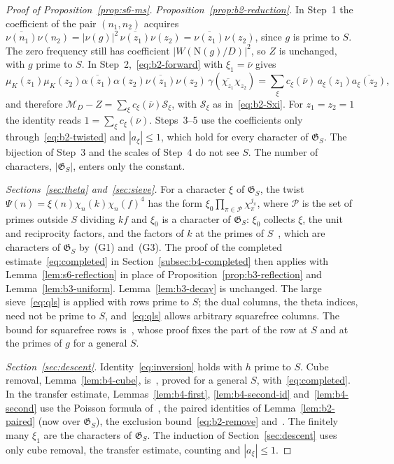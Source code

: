 \documentclass[11pt]{article}
\numberwithin{equation}{section}
\newcommand{\N}{\mathrm N}
\newcommand{\muk}{\mu_K}
\begin{document}
\begin{proof}[Proof of Proposition~\ref{prop:s6-ms}]
\emph{Proposition~\ref{prop:b2-reduction}.} In Step~1 the coefficient of the pair $(n_1,n_2)$ acquires
$\overline{\nu(n_1)}\nu(n_2)=|\nu(g)|^2\,\overline{\nu(z_1)}\nu(z_2)=\overline{\nu(z_1)}\nu(z_2)$, since $g$ is
prime to $S$. The zero frequency still has coefficient $|W(\N(g)/D)|^2$, so $Z$ is unchanged, with $g$ prime
to $S$. In Step~2,~\eqref{eq:b2-forward} with $\xi_1=\overline\nu$ gives
\begin{equation}\label{eq:d195}
 \muk(z_1)\muk(z_2)\overline{\alpha(z_1)}\alpha(z_2)\overline{\nu(z_1)}\nu(z_2)\,
 \gamma(\overline{\chi_{z_1}}\chi_{z_2})=\sum_\xi c_\xi(\overline\nu)\,a_\xi(z_1)\overline{a_\xi(z_2)},
\end{equation}
and therefore $\mathcal M_D-Z=\sum_\xi c_\xi(\overline\nu)\mathcal S_\xi$, with $\mathcal S_\xi$
as in~\eqref{eq:b2-Sxi}. For $z_1=z_2=1$ the identity reads $1=\sum_\xi c_\xi(\overline\nu)$. Steps~3--5 use
the coefficients only through~\eqref{eq:b2-twisted} and $|a_\xi|\le1$, which hold for every character of
$\mathfrak G_S$. The bijection of Step~3 and the scales of Step~4 do not see $S$. The number of characters,
$|\mathfrak G_S|$, enters only the constant.

\emph{Sections~\ref{sec:theta} and~\ref{sec:sieve}.} For a character $\xi$ of $\mathfrak G_S$, the twist
$\Psi(n)=\xi(n)\chi_n(k)\chi_n(f)^4$ has the form $\xi_0\prod_{\pi\in\mathcal P}\chi_\pi^{j_\pi}$, where
$\mathcal P$ is the set of primes outside $S$ dividing $kf$ and $\xi_0$ is a character of $\mathfrak G_S$:
$\xi_0$ collects $\xi$, the unit and reciprocity factors, and the factors of $k$ at the primes of
$S$~\cite[(6.17)]{OAI1112}, which are characters of $\mathfrak G_S$ by~(G1) and~(G3). The proof of the completed
estimate~\eqref{eq:completed} in Section~\ref{subsec:b4-completed} then applies with
Lemma~\ref{lem:s6-reflection} in place of Proposition~\ref{prop:b3-reflection} and
Lemma~\ref{lem:b3-uniform}. Lemma~\ref{lem:b3-decay} is unchanged. The large sieve~\eqref{eq:qls} is applied
with rows prime to $S$; the dual columns, the theta indices, need not be prime to $S$, and~\eqref{eq:qls} allows
arbitrary squarefree columns. The bound for
squarefree rows is~\cite[Lemma~6.6]{OAI1112}, whose proof fixes the part of the row at $S$ and at the primes of
$g$ for a general $S$.

\emph{Section~\ref{sec:descent}.} Identity~\eqref{eq:inversion} holds with $h$ prime to $S$. Cube removal,
Lemma~\ref{lem:b4-cube}, is~\cite[Lemma~5.3]{OAI1112}, proved for a general $S$, with~\eqref{eq:completed}. In
the transfer estimate, Lemmas~\ref{lem:b4-first}, \ref{lem:b4-second-id} and~\ref{lem:b4-second} use the Poisson
formula of~\cite[Lemma~21]{QF}, the paired identities of Lemma~\ref{lem:b2-paired} (now over $\mathfrak G_S$),
the exclusion bound~\eqref{eq:b2-remove} and~\cite[Lemma~B.2]{OAI1112}. The finitely many $\xi_1$ are the
characters of $\mathfrak G_S$. The induction of Section~\ref{sec:descent} uses only cube removal, the transfer
estimate, counting and $|a_\xi|\le1$.


\end{proof}
\end{document}
